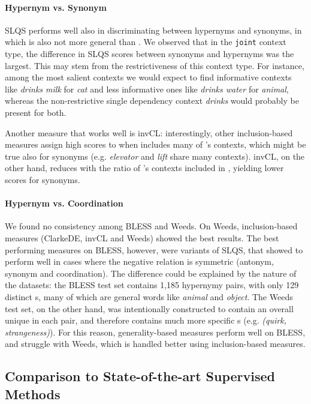 \documentclass[11pt]{article}
\newcommand\smalltt[1]{\texttt{\small #1}}
\begin{document}
\paragraph{Hypernym vs. Synonym} SLQS performs well also in discriminating between hypernyms and synonyms, in which  is also not more general than . 
We observed that in the \smalltt{joint} context type, the difference in SLQS scores between synonyms and hypernyms was the largest.
This may stem from the restrictiveness of this context type. For instance, among the most salient contexts we would expect to find informative contexts like \emph{drinks milk} for \emph{cat} and less informative ones like \emph{drinks water} for \emph{animal}, whereas the non-restrictive single dependency context \emph{drinks} would probably be present for both. 

Another measure that works well is invCL: interestingly, other inclusion-based measures assign high scores to  when  includes many of 's contexts, which might be true also for synonyms (e.g. \emph{elevator} and \emph{lift} share many contexts). invCL, on the other hand, reduces with the ratio of 's contexts included in , yielding lower scores for synonyms.

\paragraph{Hypernym vs. Coordination} We found no consistency among BLESS and Weeds. On Weeds, inclusion-based measures (ClarkeDE, invCL and Weeds) showed the best results. The best performing measures on BLESS, however, were variants of SLQS, that showed to perform well in cases where the negative relation is symmetric (antonym, synonym and coordination). The difference could be explained by the nature of the datasets: the BLESS test set contains 1,185 hypernymy pairs, with only 129 distinct s, many of which are general words like \emph{animal} and \emph{object}. The Weeds test set, on the other hand, was intentionally constructed to contain an overall unique  in each pair, and therefore contains much more specific s (e.g. \emph{(quirk, strangeness)}). For this reason, generality-based measures perform well on BLESS, and struggle with Weeds, which is handled better using inclusion-based measures.


\subsection{Comparison to State-of-the-art Supervised Methods}
\label{sec:embeddings}
\end{document}

